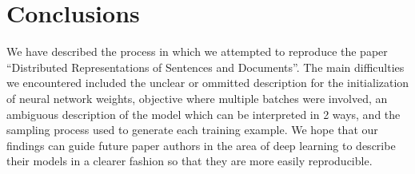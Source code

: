\documentclass{article}
\begin{document}
\section{Conclusions}
We have described the process in which we attempted to reproduce the paper ``Distributed Representations of Sentences and Documents''. The main difficulties we encountered included the unclear or ommitted description for the initialization of neural network weights, objective where multiple batches were involved, an ambiguous description of the model which can be interpreted in 2 ways, and the sampling process used to generate each training example. We hope that our findings can guide future paper authors in the area of deep learning to describe their models in a clearer fashion so that they are more easily reproducible.

{}

\end{document}
